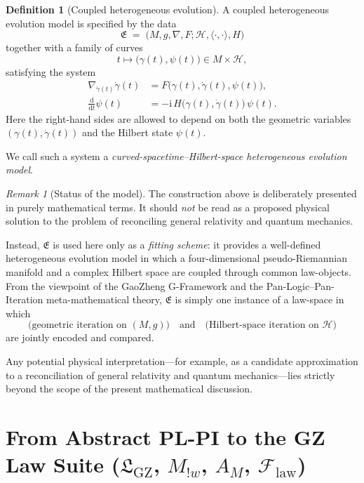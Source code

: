 \documentclass[11pt]{book}
\theoremstyle{plain}
\theoremstyle{definition}
\newtheorem{definition}[theorem]{Definition} \theoremstyle{remark}
\newtheorem{remark}[theorem]{Remark}
\newcommand{\GZLS}{\ensuremath{\mathfrak{L}_{\mathrm{GZ}}}}       \newcommand{\GZLT}{\ensuremath{M_{!w}}}                           \newcommand{\GZLOC}{\ensuremath{A_M}}                             \newcommand{\GZLCurv}{\ensuremath{\mathcal{F}_{\mathrm{law}}}}
\begin{document}
\begin{definition}[Coupled heterogeneous evolution]
A coupled heterogeneous evolution model is specified by the data
\[
  \mathfrak{E}
  \;=\;
  \big(
    M,g,\nabla,F;
    \mathcal{H},\langle\cdot,\cdot\rangle,H
  \big)
\]
together with a family of curves
\[
  t\longmapsto\big(\gamma(t),\psi(t)\big)\in M\times\mathcal{H},
\]
satisfying the system
\begin{align*}
  \nabla_{\dot\gamma(t)}\dot\gamma(t)
  &= F\big(\gamma(t),\dot\gamma(t),\psi(t)\big), \\
  \frac{\mathrm{d}}{\mathrm{d}t}\psi(t)
  &= -\mathrm{i}\,H\big(\gamma(t),\dot\gamma(t)\big)\,\psi(t).
\end{align*}
Here the right-hand sides are allowed to depend on both the geometric
variables $(\gamma(t),\dot\gamma(t))$ and the Hilbert state $\psi(t)$.

We call such a system a \emph{curved-spacetime--Hilbert-space
heterogeneous evolution model}.
\end{definition}



\begin{remark}[Status of the model]
\label{rem:GR-QM-fit}
The construction above is deliberately presented in purely mathematical
terms. It should \emph{not} be read as a proposed physical solution to
the problem of reconciling general relativity and quantum mechanics.

Instead, $\mathfrak{E}$ is used here only as a \emph{fitting scheme}:
it provides a well-defined heterogeneous evolution model in which a
four-dimensional pseudo-Riemannian manifold and a complex Hilbert space
are coupled through common law-objects. From the viewpoint of the
GaoZheng G-Framework and the Pan-Logic--Pan-Iteration
meta-mathematical theory, $\mathfrak{E}$ is simply one instance of a
law-space in which
\[
  \big(\text{geometric iteration on } (M,g)\big)
  \quad\text{and}\quad
  \big(\text{Hilbert-space iteration on } \mathcal{H}\big)
\]
are jointly encoded and compared.

Any potential physical interpretation---for example, as a candidate
approximation to a reconciliation of general relativity and quantum
mechanics---lies strictly beyond the scope of the present mathematical
discussion.
\end{remark}



\section[From Abstract PL-PI to the GZ Law Suite]{From Abstract PL-PI to the GZ Law Suite (\GZLS, \GZLT, \GZLOC, \GZLCurv)}
\end{document}
